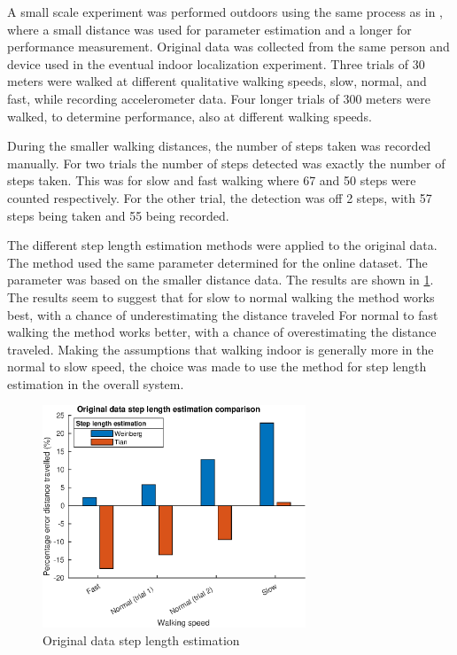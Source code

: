 A small scale experiment was performed outdoors using the same process as in \cite{Vezocnik2019}, where a small distance was used for parameter estimation and a longer for performance measurement. Original data was collected from the same person and device used in the eventual indoor localization experiment. Three trials of 30 meters were walked at different qualitative walking speeds, slow, normal, and fast, while recording accelerometer data. Four longer trials of 300 meters were walked, to determine performance, also at different walking speeds. \par 
During the smaller walking distances, the number of steps taken was recorded manually. For two trials the number of steps detected was exactly the number of steps taken. This was for slow and fast walking where 67 and 50 steps were counted respectively.  For the other trial, the detection was off 2 steps, with 57 steps being taken and 55 being recorded. \par 
The different step length estimation methods were applied to the original data. The \citet{Tian2016} method used the same parameter determined for the online dataset. The \citet{Weinberg2002} parameter was based on the smaller distance data. The results are shown in \cref{fig:step_length_personal_testing}. The results seem to suggest that for slow to normal walking the \citet{Tian2016} method works best, with a chance of underestimating the distance traveled For normal to fast walking the \citet{Weinberg2002} method works better, with a chance of overestimating the distance traveled. Making the assumptions that walking indoor is generally more in the normal to slow speed, the choice was made to use the \citet{Tian2016} method for step length estimation in the overall system.
\begin{figure}[H]
	\centering
	\includegraphics[width=0.7\textwidth]{images/20201113_1920_wienberg_vs_tian_og_data_1}
	\caption{Original data step length estimation \\ }
	\label{fig:step_length_personal_testing}
\end{figure}

